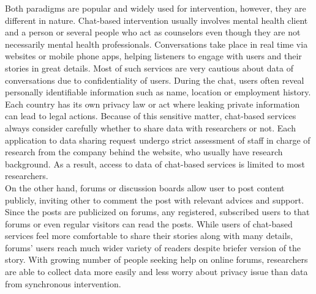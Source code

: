 Both paradigms are popular and widely used for intervention, however, they are different in nature. Chat-based intervention usually involves mental health client and a person or several people who act as counselors even though they are not necessarily mental health professionals. Conversations take place in real time via websites or mobile phone apps, helping listeners to engage with users and their stories in great details. Most of such services are very cautious about data of conversations due to confidentiality of users. During the chat, users often reveal personally identifiable information such as name, location or employment history. Each country has its own privacy law or act where leaking private information can lead to legal actions. Because of this sensitive matter, chat-based services always consider carefully whether to share data with researchers or not. Each application to data sharing request undergo strict assessment of staff in charge of research from the company behind the website, who usually have research background. As a result, access to data of chat-based services is limited to most researchers.\\

On the other hand, forums or discussion boards allow user to post content publicly, inviting other to comment the post with relevant advices and support. Since the posts are publicized on forums, any registered, subscribed users to that forums or even regular visitors can read the posts. While users of chat-based services feel more comfortable to share their stories along with many details, forums' users reach much wider variety of readers despite briefer version of the story. With growing number of people seeking help on online forums, researchers are able to collect data more easily and less worry about privacy issue than data from synchronous intervention.\\

